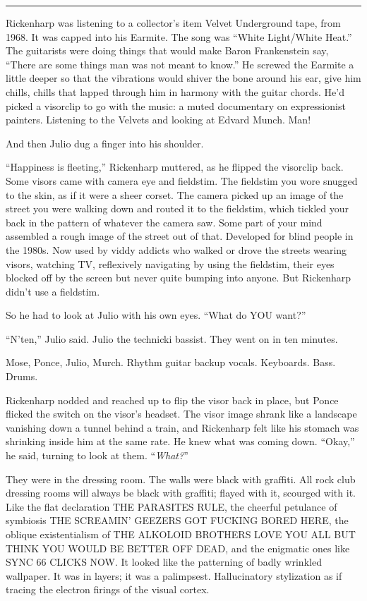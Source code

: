 \fancybreak{* * *}

Rickenharp was listening to a collector's item Velvet Underground tape, from 1968. It was capped into his Earmite. The song was ``White Light/White Heat.'' The guitarists were doing things that would make Baron Frankenstein say, ``There are some things man was not meant to know.'' He screwed the Earmite a little deeper so that the vibrations would shiver the bone around his ear, give him chills, chills that lapped through him in harmony with the guitar chords. He'd picked a visorclip to go with the music: a muted documentary on expressionist painters. Listening to the Velvets and looking at Edvard Munch. Man!

And then Julio dug a finger into his shoulder.

``Happiness is fleeting,'' Rickenharp muttered, as he flipped the visorclip back. Some visors came with camera eye and fieldstim. The fieldstim you wore snugged to the skin, as if it were a sheer corset. The camera picked up an image of the street you were walking down and routed it to the fieldstim, which tickled your back in the pattern of whatever the camera saw. Some part of your mind assembled a rough image of the street out of that. Developed for blind people in the 1980s. Now used by viddy addicts who walked or drove the streets wearing visors, watching TV, reflexively navigating by using the fieldstim, their eyes blocked off by the screen but never quite bumping into anyone. But Rickenharp didn't use a fieldstim.

So he had to look at Julio with his own eyes. ``What do YOU want?''

``N'ten,'' Julio said. Julio the technicki bassist. They went on in ten minutes.

Mose, Ponce, Julio, Murch. Rhythm guitar backup vocals. Keyboards. Bass. Drums.

Rickenharp nodded and reached up to flip the visor back in place, but Ponce flicked the switch on the visor's headset. The visor image shrank like a landscape vanishing down a tunnel behind a train, and Rickenharp felt like his stomach was shrinking inside him at the same rate. He knew what was coming down. ``Okay,'' he said, turning to look at them. ``\textit{What?}''

They were in the dressing room. The walls were black with graffiti. All rock club dressing rooms will always be black with graffiti; flayed with it, scourged with it. Like the flat declaration THE PARASITES RULE, the cheerful petulance of symbiosis THE SCREAMIN' GEEZERS GOT FUCKING BORED HERE, the oblique existentialism of THE ALKOLOID BROTHERS LOVE YOU ALL BUT THINK YOU WOULD BE BETTER OFF DEAD, and the enigmatic ones like SYNC 66 CLICKS NOW. It looked like the patterning of badly wrinkled wallpaper. It was in layers; it was a palimpsest. Hallucinatory stylization as if tracing the electron firings of the visual cortex.

